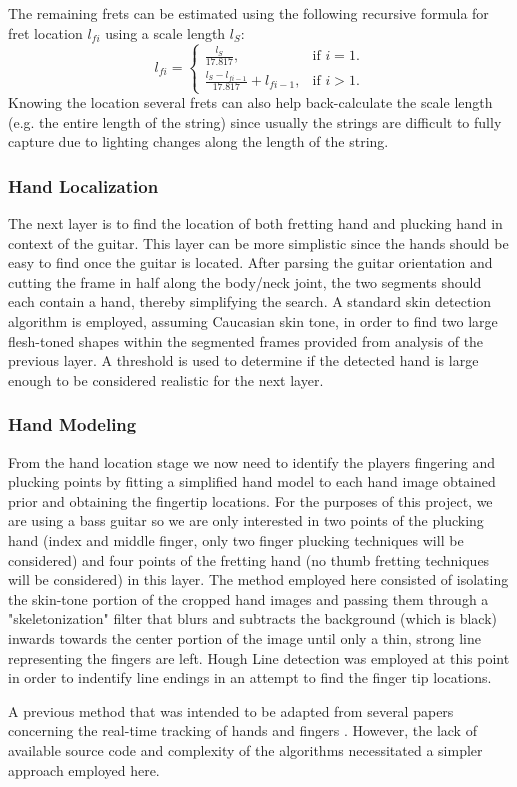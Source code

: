 The remaining frets can be estimated using the following recursive formula for fret location $l_{fi}$ using a scale length $l_S$:
\begin{equation}
    l_{fi} = \begin{cases}
        \frac{l_S}{17.817},                         & \text{if $i = 1$.} \\
        \frac{l_S - l_{fi-1}}{17.817} + l_{fi-1},   & \text{if $i > 1$.}
    \end{cases}
\end{equation}
Knowing the location several frets can also help back-calculate the scale length (e.g. the entire length of the string) since
usually the strings are difficult to fully capture due to lighting changes along the length of the string.

\subsubsection{Hand Localization}
The next layer is to find the location of both fretting hand and plucking hand in context of the guitar.
This layer can be more simplistic since the hands should be easy to find once the guitar is located.
After parsing the guitar orientation and cutting the frame in half along the body/neck joint,
the two segments should each contain a hand, thereby simplifying the search.
A standard skin detection algorithm is employed, assuming Caucasian skin tone\cite{pyimagesearch,seereality,skinsurvey},
in order to find two large flesh-toned shapes within the segmented frames provided from analysis of
the previous layer.
A threshold is used to determine if the detected hand is large enough to be considered realistic for the next layer.

\subsubsection{Hand Modeling}
From the hand location stage we now need to identify the players fingering and plucking points
by fitting a simplified hand model to each hand image obtained prior and obtaining the fingertip locations.
For the purposes of this project, we are using a bass guitar so we are only interested in two points of the plucking hand
(index and middle finger, only two finger plucking techniques will be considered)
and four points of the fretting hand (no thumb fretting techniques will be considered) in this layer.
The method employed here consisted of isolating the skin-tone portion of the cropped hand images
and passing them through a "skeletonization" filter \cite{skeleton} that blurs and subtracts the background (which is black)
inwards towards the center portion of the image until only a thin, strong line representing the fingers are left.
Hough Line detection was employed at this point in order to indentify line endings in an attempt to find the finger tip locations.
\par
A previous method that was intended to be adapted from several papers concerning the real-time tracking of hands and fingers
\cite{aslhand,handposes,fingertracking}.
However, the lack of available source code and complexity of the algorithms necessitated a simpler approach employed here.

